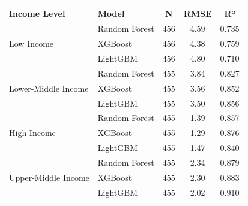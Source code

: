 \begin{tabular}{llccc}
\toprule
Income Level & Model & N & RMSE & R² \\
\midrule
\multirow{3}{*}{Low Income} & Random Forest & 456 & 4.59 & 0.735 \\
 & XGBoost & 456 & 4.38 & 0.759 \\
 & LightGBM & 456 & 4.80 & 0.710 \\
\midrule
\multirow{3}{*}{Lower-Middle Income} & Random Forest & 455 & 3.84 & 0.827 \\
 & XGBoost & 455 & 3.56 & 0.852 \\
 & LightGBM & 455 & 3.50 & 0.856 \\
\midrule
\multirow{3}{*}{High Income} & Random Forest & 455 & 1.39 & 0.857 \\
 & XGBoost & 455 & 1.29 & 0.876 \\
 & LightGBM & 455 & 1.47 & 0.840 \\
\midrule
\multirow{3}{*}{Upper-Middle Income} & Random Forest & 455 & 2.34 & 0.879 \\
 & XGBoost & 455 & 2.30 & 0.883 \\
 & LightGBM & 455 & 2.02 & 0.910 \\
\bottomrule
\end{tabular}